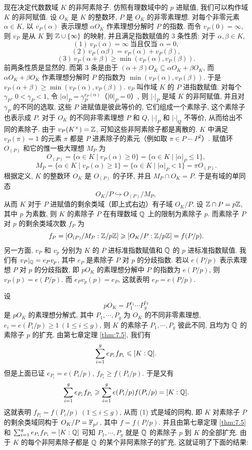 现在决定代数数域 $K$ 的非阿素除子. 仿照有理数域中的 $p$ 进赋值, 我们可以构作域 $K$ 的非阿赋值. 设 $O_K$ 是 $K$ 的整数环, $P$ 是 $O_K$ 的非零素理想. 对每个非零元素 $\alpha\in K$, 以 $v_P(\alpha)$ 表示理想 $\alpha O_K$ 作素理想分解时 $P$ 的指数. 而令 $v_P(0)=\infty$, 则 $v_P$ 是从 $K$ 到 $\mathbb{Z}\cup\{\infty\}$ 的映射, 并且满足指数赋值的 $3$ 条性质: 对于 $\alpha,\beta\in K$,
\[
  (1)\ v_P(\alpha)=\infty\ \text{当且仅当 } \alpha=0,
\]
\[
  (2)\ v_P(\alpha\beta)=v_P(\alpha)+v_P(\beta),
\]
\[
  (3)\ v_P(\alpha+\beta)\geqslant\min(v_P(\alpha),v_P(\beta)).
\]
前两条性质是显然的. 而第 $3$ 条是由于 $(\alpha+\beta)O_K\subseteq\alpha O_K+\beta O_K$, 而 $\alpha O_K+\beta O_K$ 作素理想分解时 $P$ 的指数为 $\min(v_P(\alpha),v_P(\beta))$. 于是 $v_P(\alpha+\beta)\geqslant\min(v_P(\alpha),v_P(\beta))$. $v_P$ 叫作域 $K$ 的 $P$ 进指数赋值. 对每个 $\gamma_P$, $0<\gamma_P<1$, 令 $|\alpha|_P=\gamma_P^{v_P(\alpha)}$（$|0|_P=0$）, 则 $|\cdot|_P$ 是域 $K$ 的非阿赋值, 并且对 $\gamma_P$ 的不同的选取, 这些 $P$ 进赋值是彼此等价的, 它们组成一个素除子, 这个素除子也表示成 $P$. 对于 $O_K$ 的不同非零素理想 $P$ 和 $Q$, $|\cdot|_P$ 和 $|\cdot|_Q$ 不等价, 从而给出不同的素除子. 由于 $v_P(K^{\times})=\mathbb{Z}$, 可知这些非阿素除子都是离散的. $K$ 中满足 $v_P(\pi)=1$ 的元素 $\pi$ 都是 $P$ 进素除子的素元（例如取 $\pi\in P-P^2$）. 赋值环 $O_{(P)}$ 和它的惟一极大理想 $M_P$ 为
\[
  O_{(P)}=\{\alpha\in K\mid v_P(\alpha)\geqslant 0\}
  =\{\alpha\in K\mid|\alpha|_P\leqslant 1\},
\]
\[
  M_P=\{\alpha\in K\mid v_P(\alpha)\geqslant 1\}
  =\{\alpha\in K\mid|\alpha|_P<1\}=\pi O_{(P)}.
\]
根据定义, $K$ 的整数环 $O_K$ 是 $O_{(P)}$ 的子环, 并且 $M_P\cap O_K=P$. 于是有域的单同态
\begin{equation}\tag{1}
  O_K/P\hookrightarrow O_{(P)}/M_P,
\end{equation}
从而 $K$ 对于 $P$ 进赋值的剩余类域（即上式右边）有子域 $O_K/P$. 设 $\mathbb{Z}\cap P=p\mathbb{Z}$, 其中 $p$ 为素数, 则 $K$ 的素除子 $P$ 在有理数域 $\mathbb{Q}$ 上的限制为素除子 $p$. 而素除子 $P$ 对 $p$ 的剩余类域次数 $f_P$ 为
\[
  f_P=[O_{(P)}/M_P:\mathbb{Z}/p\mathbb{Z}]\geqslant[O_K/P:\mathbb{Z}/p\mathbb{Z}]=f(P/p).
\]
另一方面, $v_P$ 和 $v_p$ 分别为 $K$ 的 $P$ 进标准指数赋值和 $\mathbb{Q}$ 的 $p$ 进标准指数赋值. 我们有 $v_P|_{\mathbb{Q}}=e_Pv_p$, 其中 $e_P$ 是素除子 $P$ 对 $p$ 的分歧指数. 若以 $e(P/p)$ 表示素理想 $P$ 对 $p$ 的分歧指数, 即 $pO_K$ 的素理想分解中 $P$ 的指数为 $e(P/p)$, 则 $v_P(p)=e(P/p)$. 而 $e_Pv_p(p)=e_P$, 这就表明 $e_P=e(P/p)$.

设
\[
  pO_K=P_1^{e_1}\cdots P_g^{e_g}
\]
是 $pO_K$ 的素理想分解式, 其中 $P_1,\cdots,P_g$ 为 $O_K$ 的不同非零素理想, $e_i=e(P_i/p)\geqslant 1\ (1\leqslant i\leqslant g)$, 则 $K$ 的素除子 $P_1,\cdots,P_g$ 彼此不同, 且均为 $\mathbb{Q}$ 的素除子 $p$ 的扩充. 由第七章定理 \ref{thm:7.5}, 我们有
\[
  \sum_{i=1}^{g}e_{P_i}f_{P_i}\leqslant[K:\mathbb{Q}].
\]
但是上面已证 $e_{P_i}=e(P_i/p)$, $f_{P_i}\geqslant f(P_i/p)$. 于是又有
\[
  \sum_{i=1}^{g}e_{P_i}f_{P_i}\geqslant\sum_{i=1}^{g}e(P_i/p)f(P_i/p)=[K:\mathbb{Q}].
\]
这就表明 $f_{P_i}=f(P_i/p)\ (1\leqslant i\leqslant g)$, 从而 (1) 式是域的同构, 即 $K$ 对素除子 $P$ 的剩余类域同构于 $O_K/P=\mathbb{F}_{p^f}$, 其中 $f=f(P/p)$. 并且由第七章定理 \ref{thm:7.5} 和 $\sum_{i=1}^{g}e_{P_i}f_{P_i}=[K:\mathbb{Q}]$ 可知 $P_1,\cdots,P_g$ 就是 $\mathbb{Q}$ 的素除子 $p$ 到 $K$ 的全部扩充. 由于 $K$ 的每个非阿素除子都是 $\mathbb{Q}$ 的某个非阿素除子的扩充, 这就证明了下面的结果:

